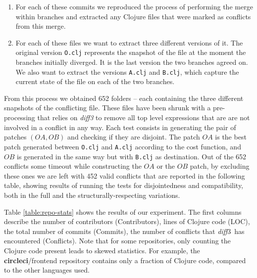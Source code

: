 \documentclass[11pt, titlepage]{article}
\newcommand{\diffthree}{\emph{diff3}\xspace}
\newcommand{\diff}{\emph{diff}}
\begin{document}
\begin{enumerate}
\item  For each of these commits we reproduced the process of performing the merge within branches and extracted any Clojure files that were marked as conflicts from this merge.

\item For each of these files we want to extract three different versions of it. The original version \texttt{O.clj} represents the snapshot of the file at the moment the branches initially diverged. It is the last version the two branches agreed on. We also want to extract the versions \texttt{A.clj} and \texttt{B.clj}, which capture the current state of the file on each of the two branches.
\end{enumerate}

From this process we obtained 652 folders -- each containing the three different snapshots of the conflicting file. These files have been shrunk with a pre-processing that relies on \diffthree to remove all top level expressions that are are not involved in a conflict in any way.
Each test consists in generating the pair of patches $(OA,OB)$ and checking if they are disjoint. 
The patch $OA$ is the best patch generated between \texttt{O.clj} and \texttt{A.clj} according to the cost function, and $OB$ is generated in the same way but with \texttt{B.clj} as destination.
Out of the 652 conflicts some timeout while constructing the $OA$ or the $OB$ patch, by excluding these ones we are left with 452 valid conflicts that are reported in the following table, showing results of running the tests for disjointedness and compatibility, both in the full and the structurally-respecting variations.

Table \ref{table:repo-stats} shows the results of our experiment. The
first columns describe the number of contributors (Contributors), 
lines of Clojure code (LOC), the total number of commits (Commits), the number of conflicts that \diff3\ has encountered (Conflicts). Note that for
some repositories, only counting the Clojure code present leads to
skewed statistics. For example, the \textbf{circleci}/frontend
repository contains only a fraction of Clojure code, compared to the
other languages used.
\end{document}
